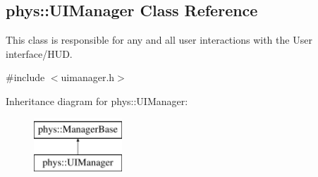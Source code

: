 \hypertarget{classphys_1_1UIManager}{
\subsection{phys::UIManager Class Reference}
\label{classphys_1_1UIManager}
}


This class is responsible for any and all user interactions with the User interface/HUD.  




{\ttfamily \#include $<$uimanager.h$>$}

Inheritance diagram for phys::UIManager:\begin{figure}[H]
\begin{center}
\leavevmode
\includegraphics[height=2.000000cm]{classphys_1_1UIManager}
\end{center}
\end{figure}
